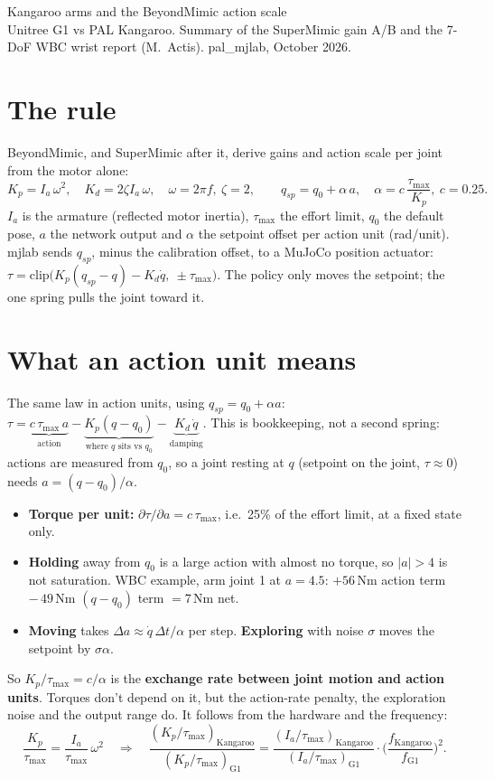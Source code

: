 \documentclass[10pt]{article}
\begin{document}
\begin{center}
{\Large Kangaroo arms and the BeyondMimic action scale}\\[3pt]
Unitree G1 vs PAL Kangaroo. Summary of the SuperMimic gain A/B and the 7-DoF WBC wrist report
(M.~Actis). pal\_mjlab, October 2026.
\end{center}

\section{The rule}

BeyondMimic, and SuperMimic after it, derive gains and action scale per joint from the motor alone:
\[
K_p = I_a\,\omega^2,\quad K_d = 2\zeta I_a\,\omega,\quad \omega = 2\pi f,\ \zeta = 2,\qquad
q_{sp} = q_0 + \alpha\,a,\quad \alpha = c\,\frac{\tau_{\max}}{K_p},\ c = 0.25 .
\]
$I_a$ is the armature (reflected motor inertia), $\tau_{\max}$ the effort limit, $q_0$ the default
pose, $a$ the network output and $\alpha$ the setpoint offset per action unit (rad/unit). mjlab sends
$q_{sp}$, minus the calibration offset, to a MuJoCo position actuator:
$\tau = \mathrm{clip}\big(K_p(q_{sp}-q) - K_d\dot q,\ \pm\tau_{\max}\big)$. The policy only moves the
setpoint; the one spring pulls the joint toward it.

\section{What an action unit means}

The same law in action units, using $q_{sp} = q_0 + \alpha a$:\quad
$\tau = \underbrace{c\,\tau_{\max}\,a}_{\text{action}} - \underbrace{K_p(q-q_0)}_{\text{where }q\text{ sits vs }q_0}
- \underbrace{K_d\,\dot q}_{\text{damping}}$.
This is bookkeeping, not a second spring: actions are measured from $q_0$, so a joint resting at $q$
(setpoint on the joint, $\tau \approx 0$) needs $a = (q-q_0)/\alpha$.
\begin{itemize}
  \setlength{\itemsep}{1pt}
  \item \textbf{Torque per unit:} $\partial\tau/\partial a = c\,\tau_{\max}$, i.e.\ 25\% of the effort
  limit, at a fixed state only.
  \item \textbf{Holding} away from $q_0$ is a large action with almost no torque, so $|a|>4$ is not
  saturation. WBC example, arm joint 1 at
  $a=4.5$: $+56$\,Nm action term $-\,49$\,Nm $(q-q_0)$ term $=7$\,Nm net.
  \item \textbf{Moving} takes $\Delta a \approx \dot q\,\Delta t/\alpha$ per step. \textbf{Exploring}
  with noise $\sigma$ moves the setpoint by $\sigma\alpha$.
\end{itemize}
So $K_p/\tau_{\max} = c/\alpha$ is the \textbf{exchange rate between joint motion and action units}.
Torques don't depend on it, but the action-rate penalty, the exploration noise and the output range
do. It follows from the hardware and the frequency:
\[
\frac{K_p}{\tau_{\max}} = \frac{I_a}{\tau_{\max}}\,\omega^2
\quad\Rightarrow\quad
\frac{(K_p/\tau_{\max})_{\text{Kangaroo}}}{(K_p/\tau_{\max})_{\text{G1}}}
= \frac{(I_a/\tau_{\max})_{\text{Kangaroo}}}{(I_a/\tau_{\max})_{\text{G1}}}\cdot
\Big(\frac{f_{\text{Kangaroo}}}{f_{\text{G1}}}\Big)^{2}.
\]
\end{document}
